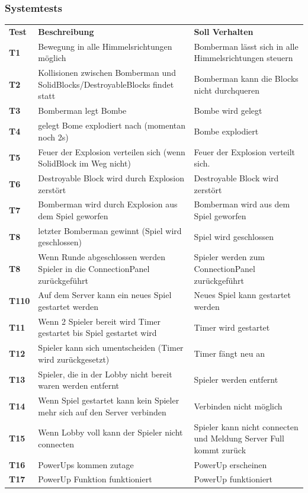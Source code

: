 \documentclass[11pt]{scrartcl}
\begin{document}
\subsubsection{Systemtests}
\begin{tabularx}{\linewidth}{l X X}
  \bf{Test} & \bf{Beschreibung} & \bf{Soll Verhalten} \\
  \bf{T1} & Bewegung in alle Himmelsrichtungen möglich & 
  Bomberman lässt sich in alle Himmelsrichtungen steuern\\
  \bf{T2} & Kollisionen zwischen Bomberman und SolidBlocks/DestroyableBlocks 
  findet statt & Bomberman kann die Blocks nicht durchqueren \\
  \bf{T3} & Bomberman legt Bombe & Bombe wird gelegt \\
  \bf{T4} & gelegt Bome explodiert nach (momentan noch 2s) & Bombe explodiert \\
  \bf{T5} & Feuer der Explosion verteilen sich (wenn SolidBlock im Weg nicht) & Feuer der 
  Explosion verteilt sich.\\
  \bf{T6} & Destroyable Block wird durch Explosion zerstört & Destroyable Block wird 
  zerstört \\
  \bf{T7} & Bomberman wird durch Explosion aus dem Spiel geworfen & 
  Bomberman wird aus dem Spiel geworfen\\
  \bf{T8} & letzter Bomberman gewinnt (Spiel wird geschlossen) & Spiel wird 
  geschlossen \\
  \bf{T8} & Wenn Runde abgeschlossen werden Spieler in die ConnectionPanel zurückgeführt & 
  Spieler werden zum ConnectionPanel zurückgeführt \\
  \bf{T110} & Auf dem Server kann ein neues Spiel gestartet werden & Neues Spiel 
  kann gestartet werden \\
  \bf{T11} & Wenn 2 Spieler bereit wird Timer gestartet bis Spiel gestartet 
  wird & Timer wird gestartet \\
  \bf{T12} & Spieler kann sich umentscheiden (Timer wird zurückgesetzt) & Timer 
  fängt neu an \\
  \bf{T13} & Spieler, die in der Lobby nicht bereit waren werden entfernt & 
  Spieler werden entfernt \\
  \bf{T14} & Wenn Spiel gestartet kann kein Spieler mehr sich auf den Server 
  verbinden & Verbinden nicht möglich \\
  \bf{T15} & Wenn Lobby voll kann der Spieler nicht connecten & Spieler kann 
  nicht connecten und Meldung Server Full kommt zurück \\
  \bf{T16} & PowerUps kommen zutage & PowerUp erscheinen \\
  \bf{T17} & PowerUp Funktion funktioniert & PowerUp funktioniert \\
\end{tabularx}
\end{document}
